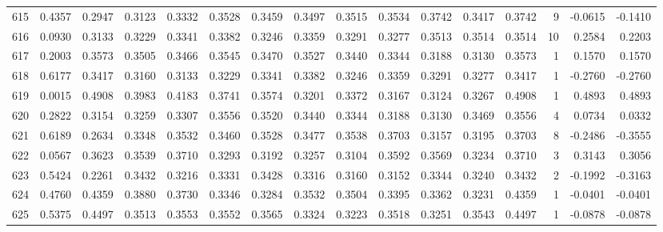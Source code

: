 \begin{tabular}{lrrrrrrrrrrrrrrr}
615 &      0.4357 &  0.2947 &  0.3123 &  0.3332 &  0.3528 &  0.3459 &  0.3497 &  0.3515 &  0.3534 &  0.3742 &   0.3417 &     0.3742 &      9 &                   -0.0615 &                    -0.1410 \\
616 &      0.0930 &  0.3133 &  0.3229 &  0.3341 &  0.3382 &  0.3246 &  0.3359 &  0.3291 &  0.3277 &  0.3513 &   0.3514 &     0.3514 &     10 &                    0.2584 &                     0.2203 \\
617 &      0.2003 &  0.3573 &  0.3505 &  0.3466 &  0.3545 &  0.3470 &  0.3527 &  0.3440 &  0.3344 &  0.3188 &   0.3130 &     0.3573 &      1 &                    0.1570 &                     0.1570 \\
618 &      0.6177 &  0.3417 &  0.3160 &  0.3133 &  0.3229 &  0.3341 &  0.3382 &  0.3246 &  0.3359 &  0.3291 &   0.3277 &     0.3417 &      1 &                   -0.2760 &                    -0.2760 \\
619 &      0.0015 &  0.4908 &  0.3983 &  0.4183 &  0.3741 &  0.3574 &  0.3201 &  0.3372 &  0.3167 &  0.3124 &   0.3267 &     0.4908 &      1 &                    0.4893 &                     0.4893 \\
620 &      0.2822 &  0.3154 &  0.3259 &  0.3307 &  0.3556 &  0.3520 &  0.3440 &  0.3344 &  0.3188 &  0.3130 &   0.3469 &     0.3556 &      4 &                    0.0734 &                     0.0332 \\
621 &      0.6189 &  0.2634 &  0.3348 &  0.3532 &  0.3460 &  0.3528 &  0.3477 &  0.3538 &  0.3703 &  0.3157 &   0.3195 &     0.3703 &      8 &                   -0.2486 &                    -0.3555 \\
622 &      0.0567 &  0.3623 &  0.3539 &  0.3710 &  0.3293 &  0.3192 &  0.3257 &  0.3104 &  0.3592 &  0.3569 &   0.3234 &     0.3710 &      3 &                    0.3143 &                     0.3056 \\
623 &      0.5424 &  0.2261 &  0.3432 &  0.3216 &  0.3331 &  0.3428 &  0.3316 &  0.3160 &  0.3152 &  0.3344 &   0.3240 &     0.3432 &      2 &                   -0.1992 &                    -0.3163 \\
624 &      0.4760 &  0.4359 &  0.3880 &  0.3730 &  0.3346 &  0.3284 &  0.3532 &  0.3504 &  0.3395 &  0.3362 &   0.3231 &     0.4359 &      1 &                   -0.0401 &                    -0.0401 \\
625 &      0.5375 &  0.4497 &  0.3513 &  0.3553 &  0.3552 &  0.3565 &  0.3324 &  0.3223 &  0.3518 &  0.3251 &   0.3543 &     0.4497 &      1 &                   -0.0878 &                    -0.0878 \\

\end{tabular}
